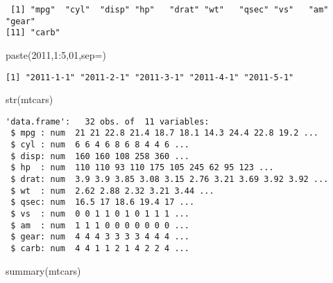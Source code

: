 \documentclass[
  letterpaper,
  DIV=11,
  numbers=noendperiod]{scrreprt}
\newenvironment{Shaded}{\begin{snugshade}}{\end{snugshade}}
\newcommand{\AttributeTok}[1]{\textcolor[rgb]{0.40,0.45,0.13}{#1}}
\newcommand{\DecValTok}[1]{\textcolor[rgb]{0.68,0.00,0.00}{#1}}
\newcommand{\FunctionTok}[1]{\textcolor[rgb]{0.28,0.35,0.67}{#1}}
\newcommand{\NormalTok}[1]{\textcolor[rgb]{0.00,0.23,0.31}{#1}}
\newcommand{\SpecialCharTok}[1]{\textcolor[rgb]{0.37,0.37,0.37}{#1}}
\newcommand{\StringTok}[1]{\textcolor[rgb]{0.13,0.47,0.30}{#1}}
\begin{document}
\begin{verbatim}
 [1] "mpg"  "cyl"  "disp" "hp"   "drat" "wt"   "qsec" "vs"   "am"   "gear"
[11] "carb"
\end{verbatim}

\begin{Shaded}
\begin{Highlighting}[]
\FunctionTok{paste}\NormalTok{(}\DecValTok{2011}\NormalTok{,}\DecValTok{1}\SpecialCharTok{:}\DecValTok{5}\NormalTok{,}\DecValTok{01}\NormalTok{,}\AttributeTok{sep=}\StringTok{\textquotesingle{}{-}\textquotesingle{}}\NormalTok{)}
\end{Highlighting}
\end{Shaded}

\begin{verbatim}
[1] "2011-1-1" "2011-2-1" "2011-3-1" "2011-4-1" "2011-5-1"
\end{verbatim}

\begin{Shaded}
\begin{Highlighting}[]
\FunctionTok{str}\NormalTok{(mtcars)}
\end{Highlighting}
\end{Shaded}

\begin{verbatim}
'data.frame':   32 obs. of  11 variables:
 $ mpg : num  21 21 22.8 21.4 18.7 18.1 14.3 24.4 22.8 19.2 ...
 $ cyl : num  6 6 4 6 8 6 8 4 4 6 ...
 $ disp: num  160 160 108 258 360 ...
 $ hp  : num  110 110 93 110 175 105 245 62 95 123 ...
 $ drat: num  3.9 3.9 3.85 3.08 3.15 2.76 3.21 3.69 3.92 3.92 ...
 $ wt  : num  2.62 2.88 2.32 3.21 3.44 ...
 $ qsec: num  16.5 17 18.6 19.4 17 ...
 $ vs  : num  0 0 1 1 0 1 0 1 1 1 ...
 $ am  : num  1 1 1 0 0 0 0 0 0 0 ...
 $ gear: num  4 4 4 3 3 3 3 4 4 4 ...
 $ carb: num  4 4 1 1 2 1 4 2 2 4 ...
\end{verbatim}

\begin{Shaded}
\begin{Highlighting}[]
\FunctionTok{summary}\NormalTok{(mtcars)}
\end{Highlighting}
\end{Shaded}
\end{document}
